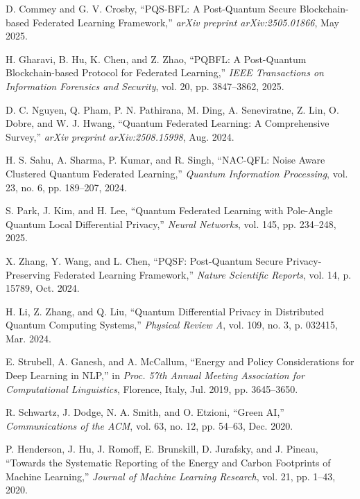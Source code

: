 \documentclass[10pt,journal,compsoc]{IEEEtran}
\begin{document}

\begin{thebibliography}{40}

D. Commey and G. V. Crosby, ``PQS-BFL: A Post-Quantum Secure Blockchain-based Federated Learning Framework,'' \textit{arXiv preprint arXiv:2505.01866}, May 2025.

H. Gharavi, B. Hu, K. Chen, and Z. Zhao, ``PQBFL: A Post-Quantum Blockchain-based Protocol for Federated Learning,'' \textit{IEEE Transactions on Information Forensics and Security}, vol. 20, pp. 3847--3862, 2025.

D. C. Nguyen, Q. Pham, P. N. Pathirana, M. Ding, A. Seneviratne, Z. Lin, O. Dobre, and W. J. Hwang, ``Quantum Federated Learning: A Comprehensive Survey,'' \textit{arXiv preprint arXiv:2508.15998}, Aug. 2024.

H. S. Sahu, A. Sharma, P. Kumar, and R. Singh, ``NAC-QFL: Noise Aware Clustered Quantum Federated Learning,'' \textit{Quantum Information Processing}, vol. 23, no. 6, pp. 189--207, 2024.

S. Park, J. Kim, and H. Lee, ``Quantum Federated Learning with Pole-Angle Quantum Local Differential Privacy,'' \textit{Neural Networks}, vol. 145, pp. 234--248, 2025.

X. Zhang, Y. Wang, and L. Chen, ``PQSF: Post-Quantum Secure Privacy-Preserving Federated Learning Framework,'' \textit{Nature Scientific Reports}, vol. 14, p. 15789, Oct. 2024.

H. Li, Z. Zhang, and Q. Liu, ``Quantum Differential Privacy in Distributed Quantum Computing Systems,'' \textit{Physical Review A}, vol. 109, no. 3, p. 032415, Mar. 2024.

E. Strubell, A. Ganesh, and A. McCallum, ``Energy and Policy Considerations for Deep Learning in NLP,'' in \textit{Proc. 57th Annual Meeting Association for Computational Linguistics}, Florence, Italy, Jul. 2019, pp. 3645--3650.

R. Schwartz, J. Dodge, N. A. Smith, and O. Etzioni, ``Green AI,'' \textit{Communications of the ACM}, vol. 63, no. 12, pp. 54--63, Dec. 2020.

P. Henderson, J. Hu, J. Romoff, E. Brunskill, D. Jurafsky, and J. Pineau, ``Towards the Systematic Reporting of the Energy and Carbon Footprints of Machine Learning,'' \textit{Journal of Machine Learning Research}, vol. 21, pp. 1--43, 2020.


\end{thebibliography}
\end{document}
